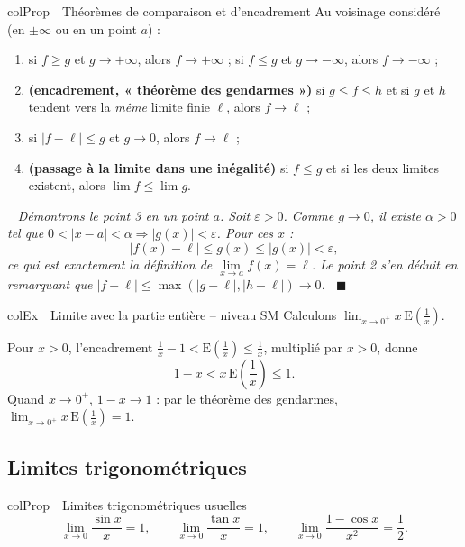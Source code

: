 \documentclass[11pt,a4paper]{article}
\newenvironment{propriete}[1][Propriété]
  {\begin{fiche}{colProp}{\ding{72}~~#1}}{\end{fiche}}
\newenvironment{exemple}[1][Exemple]
  {\begin{fiche}{colEx}{\ding{217}~~#1}}{\end{fiche}}
\newenvironment{demo}
  {\par\smallskip\noindent{\sffamily\bfseries\color{qtealdark}Démonstration.}\ \itshape}
  {\ \normalfont\hfill$\blacksquare$\par\medskip}
\newcommand{\E}{\mathrm{E}}
\begin{document}
\begin{propriete}[Théorèmes de comparaison et d'encadrement]
Au voisinage considéré (en $\pm\infty$ ou en un point $a$) :
\begin{enumerate}[leftmargin=7mm, itemsep=0.5mm]
  \item si $f \geq g$ et $g \to +\infty$, alors $f \to +\infty$ ; si $f \leq g$ et $g \to -\infty$, alors $f \to -\infty$ ;
  \item \textbf{(encadrement, « théorème des gendarmes »)} si $g \leq f \leq h$ et si $g$ et $h$ tendent vers la \emph{même} limite finie $\ell$, alors $f \to \ell$ ;
  \item si $|f - \ell| \leq g$ et $g \to 0$, alors $f \to \ell$ ;
  \item \textbf{(passage à la limite dans une inégalité)} si $f \leq g$ et si les deux limites existent, alors $\lim f \leq \lim g$.
\end{enumerate}
\end{propriete}

\begin{demo}
Démontrons le point 3 en un point $a$. Soit $\varepsilon > 0$. Comme $g \to 0$, il existe $\alpha > 0$ tel que $0 < |x - a| < \alpha \Rightarrow |g(x)| < \varepsilon$. Pour ces $x$ :
\[
  |f(x) - \ell| \leq g(x) \leq |g(x)| < \varepsilon,
\]
ce qui est exactement la définition de $\lim\limits_{x \to a} f(x) = \ell$. Le point 2 s'en déduit en remarquant que $|f - \ell| \leq \max(|g - \ell|, |h - \ell|) \to 0$.
\end{demo}

\begin{exemple}[Limite avec la partie entière -- niveau SM]
Calculons $\displaystyle\lim_{x \to 0^+} x\,\E\!\left(\frac{1}{x}\right)$.

\smallskip
Pour $x > 0$, l'encadrement $\frac{1}{x} - 1 < \E\!\left(\frac{1}{x}\right) \leq \frac{1}{x}$, multiplié par $x > 0$, donne
\[
  1 - x < x\,\E\!\left(\frac{1}{x}\right) \leq 1.
\]
Quand $x \to 0^+$, $1 - x \to 1$ : par le théorème des gendarmes,
$\displaystyle\lim_{x \to 0^+} x\,\E\!\left(\frac{1}{x}\right) = 1$.
\end{exemple}

\subsection{Limites trigonométriques}

\begin{propriete}[Limites trigonométriques usuelles]
\[
  \lim_{x \to 0} \frac{\sin x}{x} = 1, \qquad
  \lim_{x \to 0} \frac{\tan x}{x} = 1, \qquad
  \lim_{x \to 0} \frac{1 - \cos x}{x^2} = \frac{1}{2}.
\]
\end{propriete}
\end{document}
